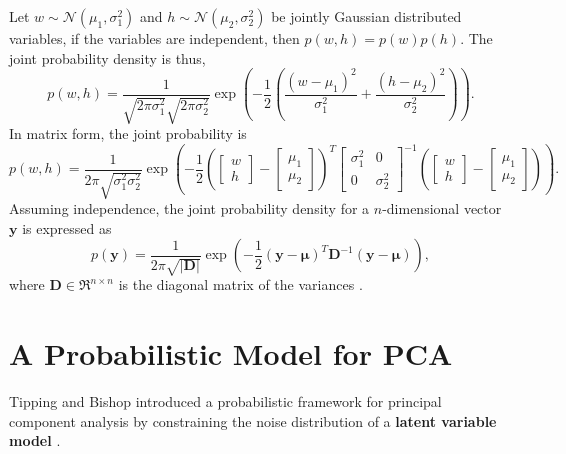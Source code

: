\documentclass[ %
author={Dillon Keith Diep},
supervisor={Dr. Carl Henrik Ek},
degree={MEng},
title={ART-CG Hair:},
subtitle={Assisted Real-time Content Generation of Stylised Virtual Hair},
type={Research},
year={2017} ]{dissertation}
\begin{document}
Let $w\sim\mathcal{N}(\mu_1, \sigma^2_1)$ and $h\sim\mathcal{N}(\mu_2, \sigma^2_2)$ be jointly Gaussian distributed variables, if the variables are independent, then $p(w,h)=p(w)p(h)$.
The joint probability density is thus,
$$p(w,h)=\frac{1}{\sqrt{2\pi\sigma^2_1}\sqrt{2\pi\sigma^2_2}}
\exp\left(-\frac{1}{2}\left(\frac{(w-\mu_1)^2}{\sigma^2_1}+\frac{(h-\mu_2)^2}{\sigma^2_2}\right)\right).$$
In matrix form, the joint probability is
$$p(w,h)=\frac{1}{2\pi\sqrt{\sigma^2_1\sigma^2_2}}\exp
\left(
-\frac{1}{2}
\left(
\left[
\begin{matrix}
w \\
h
\end{matrix}
\right]
-
\left[
\begin{matrix}
\mu_1 \\
\mu_2
\end{matrix}
\right]
\right)^T
\left[
\begin{matrix}
\sigma^2_1  &   0\\
0           &   \sigma^2_2
\end{matrix}
\right]^{-1}
\left(
\left[
\begin{matrix}
w \\
h
\end{matrix}
\right]
-
\left[
\begin{matrix}
\mu_1 \\
\mu_2
\end{matrix}
\right]
\right)
\right).$$
Assuming independence, the joint probability density for a $n$-dimensional vector $\bm{y}$ is expressed as
\begin{equation} \label{jointpd}
p(\bm{y})=\frac{1}{2\pi\sqrt{|\bm{D}|}}\exp\left(-\frac{1}{2}(\bm{y}-\bm{\mu})^T\bm{D}^{-1}(\bm{y}-\bm{\mu})\right),
\end{equation}
where $\bm{D}\in\Re^{n \times n}$ is the diagonal matrix of the variances \cite[p.78]{bishop}.

\section{A Probabilistic Model for PCA}
Tipping and Bishop introduced a probabilistic framework for principal component analysis by constraining the noise distribution of a \textbf{latent variable model} \cite{ppca}.
\end{document}
